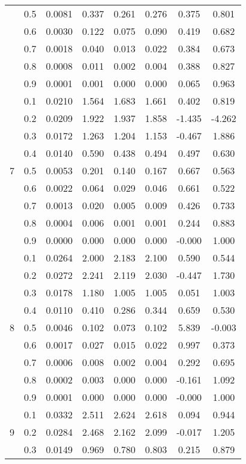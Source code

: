 \documentclass[11pt,a4paper]{report}
\begin{document}
\begin{longtable}{ | c | c || c | c | c | c | c | c | }
 & 0.5 & 0.0081 & 0.337 & 0.261 & 0.276 & 0.375 & 0.801 \\
 & 0.6 & 0.0030 & 0.122 & 0.075 & 0.090 & 0.419 & 0.682 \\
 & 0.7 & 0.0018 & 0.040 & 0.013 & 0.022 & 0.384 & 0.673 \\
 & 0.8 & 0.0008 & 0.011 & 0.002 & 0.004 & 0.388 & 0.827 \\
 & 0.9 & 0.0001 & 0.001 & 0.000 & 0.000 & 0.065 & 0.963 \\
 \hline
\multirow{9}{*}{7} & 0.1 & 0.0210 & 1.564 & 1.683 & 1.661 & 0.402 & 0.819 \\
 & 0.2 & 0.0209 & 1.922 & 1.937 & 1.858 & -1.435 & -4.262 \\
 & 0.3 & 0.0172 & 1.263 & 1.204 & 1.153 & -0.467 & 1.886 \\
 & 0.4 & 0.0140 & 0.590 & 0.438 & 0.494 & 0.497 & 0.630 \\
 & 0.5 & 0.0053 & 0.201 & 0.140 & 0.167 & 0.667 & 0.563 \\
 & 0.6 & 0.0022 & 0.064 & 0.029 & 0.046 & 0.661 & 0.522 \\
 & 0.7 & 0.0013 & 0.020 & 0.005 & 0.009 & 0.426 & 0.733 \\
 & 0.8 & 0.0004 & 0.006 & 0.001 & 0.001 & 0.244 & 0.883 \\
 & 0.9 & 0.0000 & 0.000 & 0.000 & 0.000 & -0.000 & 1.000 \\
 \hline
\multirow{9}{*}{8} & 0.1 & 0.0264 & 2.000 & 2.183 & 2.100 & 0.590 & 0.544 \\
 & 0.2 & 0.0272 & 2.241 & 2.119 & 2.030 & -0.447 & 1.730 \\
 & 0.3 & 0.0178 & 1.180 & 1.005 & 1.005 & 0.051 & 1.003 \\
 & 0.4 & 0.0110 & 0.410 & 0.286 & 0.344 & 0.659 & 0.530 \\
 & 0.5 & 0.0046 & 0.102 & 0.073 & 0.102 & 5.839 & -0.003 \\
 & 0.6 & 0.0017 & 0.027 & 0.015 & 0.022 & 0.997 & 0.373 \\
 & 0.7 & 0.0006 & 0.008 & 0.002 & 0.004 & 0.292 & 0.695 \\
 & 0.8 & 0.0002 & 0.003 & 0.000 & 0.000 & -0.161 & 1.092 \\
 & 0.9 & 0.0001 & 0.000 & 0.000 & 0.000 & -0.000 & 1.000 \\
 \hline
\multirow{9}{*}{9} & 0.1 & 0.0332 & 2.511 & 2.624 & 2.618 & 0.094 & 0.944 \\
 & 0.2 & 0.0284 & 2.468 & 2.162 & 2.099 & -0.017 & 1.205 \\
 & 0.3 & 0.0149 & 0.969 & 0.780 & 0.803 & 0.215 & 0.879 \\

\end{longtable}
\end{document}

